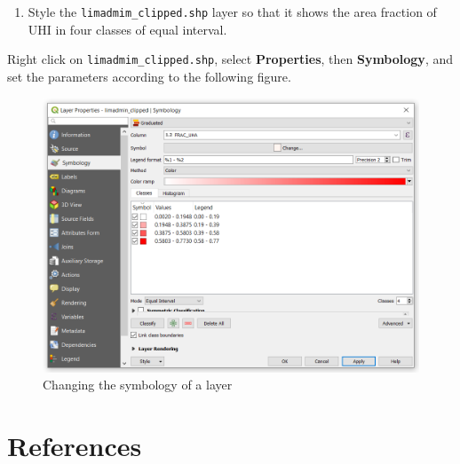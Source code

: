 \documentclass[]{book}
\providecommand{\tightlist}{%
  \setlength{\itemsep}{0pt}\setlength{\parskip}{0pt}}
\theoremstyle{definition}
\theoremstyle{definition}
\theoremstyle{definition}
\theoremstyle{remark}
\begin{document}
\begin{enumerate}
\def\labelenumi{\arabic{enumi}.}
\setcounter{enumi}{9}
\tightlist
\item
  Style the \texttt{limadmim\_clipped.shp} layer so that it shows the
  area fraction of UHI in four classes of equal interval.
\end{enumerate}

Right click on \texttt{limadmim\_clipped.shp}, select
\textbf{Properties}, then \textbf{Symbology}, and set the parameters
according to the following figure.

\begin{figure}

{\centering \includegraphics[width=14.17in]{figures/Area_Fraction_UHA} 

}

\caption{Changing the symbology of a layer}\label{fig:unnamed-chunk-38}
\end{figure}

\chapter{References}\label{references}
\end{document}
